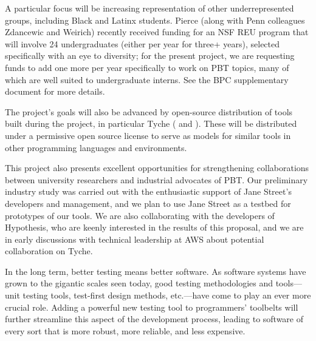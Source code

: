 {A particular focus
will be increasing representation of
other underrepresented groups, including Black and Latinx
students. Pierce (along with Penn colleagues Zdancewic and Weirich)
recently received funding for an
NSF REU program that will involve 24 undergraduates (either per
year for three+ years), selected specifically with an eye to diversity;
for the present project, we are requesting funds to add one more per
year specifically to work on PBT topics, many of which are well suited
to undergraduate interns. See the BPC
supplementary
document for more details.

\smallskip
{}
%
The project's goals will also be advanced by open-source distribution of tools
built during the project, in particular Tyche
( and
). These will be distributed under a permissive
open source license to serve as models for similar tools in other
programming languages and environments.

This project also presents excellent opportunities for strengthening
collaborations between university researchers and industrial advocates
of PBT.  Our preliminary industry study was carried out with the
enthusiastic support of Jane Street's developers and management, and we plan
to use Jane Street as a testbed for prototypes of our
tools.  We are also collaborating with the
developers of Hypothesis, who are keenly
interested in the results of this proposal, and we are in early
discussions with technical leadership at AWS about potential
collaboration on Tyche.

In the long term, better testing means better software.  As software
systems have grown to the gigantic scales seen today, good testing
methodologies and tools---unit testing tools, test-first design
methods, etc.---have come to play an ever more crucial role.  Adding a
powerful new testing tool to programmers' toolbelts will further streamline
this aspect of the development process, leading to software of every
sort that is more robust, more reliable, and less expensive. 



}
